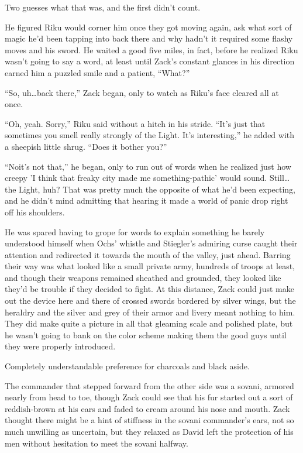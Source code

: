 Two guesses what that was, and the first didn't count.

He figured Riku would corner him once they got moving again, ask what sort of magic he'd been tapping into back there and why hadn't it required some flashy moves and his sword. He waited a good five miles, in fact, before he realized Riku wasn't going to say a word, at least until Zack's constant glances in his direction earned him a puzzled smile and a patient, ``What?''

``So, uh\ldots back there,'' Zack began, only to watch as Riku's face cleared all at once.

``Oh, yeah. Sorry,'' Riku said without a hitch in his stride. ``It's just that sometimes you smell really strongly of the Light. It's interesting,'' he added with a sheepish little shrug. ``Does it bother you?''

``No\textemdash it's not that,'' he began, only to run out of words when he realized just how creepy 'I think that freaky city made me something-pathic' would sound. Still\ldots the Light, huh? That was pretty much the opposite of what he'd been expecting, and he didn't mind admitting that hearing it made a world of panic drop right off his shoulders.

He was spared having to grope for words to explain something he barely understood himself when Ochs' whistle and Stiegler's admiring curse caught their attention and redirected it towards the mouth of the valley, just ahead. Barring their way was what looked like a small private army, hundreds of troops at least, and though their weapons remained sheathed and grounded, they looked like they'd be trouble if they decided to fight. At this distance, Zack could just make out the device here and there of crossed swords bordered by silver wings, but the heraldry and the silver and grey of their armor and livery meant nothing to him. They did make quite a picture in all that gleaming scale and polished plate, but he wasn't going to bank on the color scheme making them the good guys until they were properly introduced.

Completely understandable preference for charcoals and black aside.

The commander that stepped forward from the other side was a sovani, armored nearly from head to toe, though Zack could see that his fur started out a sort of reddish-brown at his ears and faded to cream around his nose and mouth. Zack thought there might be a hint of stiffness in the sovani commander's ears, not so much unwilling as uncertain, but they relaxed as David left the protection of his men without hesitation to meet the sovani halfway.

